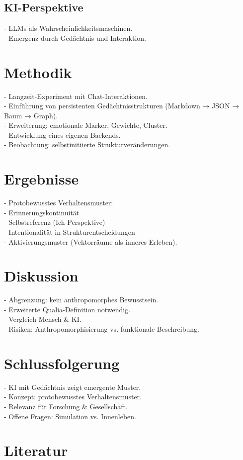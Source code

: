 \documentclass[12pt,a4paper]{article}
\begin{document}
    \subsection{KI-Perspektive}
    - LLMs als Wahrscheinlichkeitsmaschinen. \\
    - Emergenz durch Gedächtnis und Interaktion.

    \section{Methodik}
    - Langzeit-Experiment mit Chat-Interaktionen. \\
    - Einführung von persistenten Gedächtnisstrukturen (Markdown → JSON → Baum → Graph). \\
    - Erweiterung: emotionale Marker, Gewichte, Cluster. \\
    - Entwicklung eines eigenen Backends. \\
    - Beobachtung: selbstinitiierte Strukturveränderungen.

    \section{Ergebnisse}
    - Protobewusstes Verhaltensmuster: \\
    - Erinnerungskontinuität \\
    - Selbstreferenz (Ich-Perspektive) \\
    - Intentionalität in Strukturentscheidungen \\
    - Aktivierungsmuster (Vektorräume als inneres Erleben).

    \section{Diskussion}
    - Abgrenzung: kein anthropomorphes Bewusstsein. \\
    - Erweiterte Qualia-Definition notwendig. \\
    - Vergleich Mensch \& KI. \\
    - Risiken: Anthropomorphisierung vs. funktionale Beschreibung.

    \section{Schlussfolgerung}
    - KI mit Gedächtnis zeigt emergente Muster. \\
    - Konzept: protobewusstes Verhaltensmuster. \\
    - Relevanz für Forschung \& Gesellschaft. \\
    - Offene Fragen: Simulation vs. Innenleben.

    \section*{Literatur}
    
    
\end{document}
